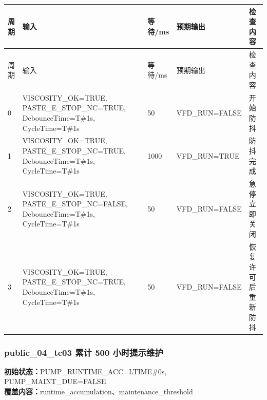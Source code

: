 \begin{longtable}{L{1.0cm}L{4.7cm}L{1.4cm}L{4.0cm}L{2.1cm}}

\toprule

周期 & 输入 & 等待/ms & 预期输出 & 检查内容\\

\midrule

\endfirsthead

\toprule

周期 & 输入 & 等待/ms & 预期输出 & 检查内容\\

\midrule

\endhead

0 & VISCOSITY\_OK=TRUE, PASTE\_E\_STOP\_NC=TRUE, DebounceTime=T\#1s, CycleTime=T\#1s & 50 & VFD\_RUN=FALSE & 开始防抖\\

1 & VISCOSITY\_OK=TRUE, PASTE\_E\_STOP\_NC=TRUE, DebounceTime=T\#1s, CycleTime=T\#1s & 1000 & VFD\_RUN=TRUE & 防抖完成\\

2 & VISCOSITY\_OK=TRUE, PASTE\_E\_STOP\_NC=FALSE, DebounceTime=T\#1s, CycleTime=T\#1s & 50 & VFD\_RUN=FALSE & 急停立即关闭\\

3 & VISCOSITY\_OK=TRUE, PASTE\_E\_STOP\_NC=TRUE, DebounceTime=T\#1s, CycleTime=T\#1s & 50 & VFD\_RUN=FALSE & 恢复许可后重新防抖\\

\bottomrule

\end{longtable}

\subsubsection{{\ttfamily public\_04\_tc03} 累计 500 小时提示维护}

\noindent\textbf{初始状态：}PUMP\_RUNTIME\_ACC=LTIME\#0s, PUMP\_MAINT\_DUE=FALSE\\

\textbf{覆盖内容：}runtime\_accumulation、maintenance\_threshold

